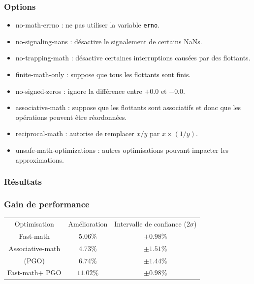 \documentclass{beamer}
\begin{document}
\begin{frame}[fragile]
    \frametitle{Options}

    \begin{itemize}
        \item no-math-errno : ne pas utiliser la variable \verb'erno'.
        \item no-signaling-nans : désactive le signalement de certains NaNs.
        \item no-trapping-math : désactive certaines interruptions causées par des flottants.
        \item finite-math-only : suppose que tous les flottants sont finis.
        \item no-signed-zeros : ignore la différence entre $+0.0$ et $-0.0$.
        \item associative-math : suppose que les flottants sont associatifs et donc que les opérations peuvent être réordonnées.
        \item reciprocal-math : autorise de remplacer $x/y$ par $x \times (1/y)$.
        \item unsafe-math-optimizations : autres optimisations pouvant impacter les approximations.
    \end{itemize}
\end{frame}

\subsubsection{Résultats}

\begin{frame}[fragile]
    \frametitle{Gain de performance}

    \begin{center}
        \begin{tabular}{ c c c }
            Optimisation                    & Amélioration & Intervalle de confiance ($2\sigma$) \\
            Fast-math\footnotemark[1]       & $5.06\%$     & $\pm 0.98\%$                        \\
            Associative-math                & $4.73\%$     & $\pm 1.51\%$                        \\
            (PGO)                           & $6.74\%$     & $\pm 1.44\%$                        \\
            Fast-math\footnotemark[1] + PGO & $11.02\%$    & $\pm 0.98\%$
        \end{tabular}
    \end{center}

\end{frame}
\end{document}
